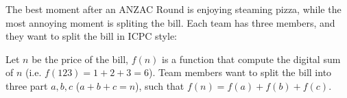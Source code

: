 The best moment after an ANZAC Round is enjoying steaming pizza, while the most annoying moment
is spliting the bill. Each team has three members, and they want to split the bill in ICPC
style:

Let $n$ be the price of the bill, $f(n)$ is a function that compute the digital sum of $n$
(i.e. $f(123) = 1 +  2 + 3 = 6$). Team members want to split the bill into three part $a,b,c$
($a+b+c=n$), such that $f(n) = f(a) + f(b) + f(c)$.
